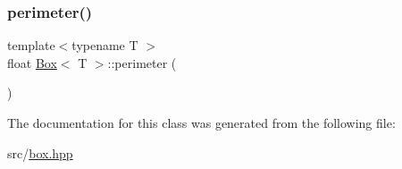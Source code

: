 \mbox{\label{classBox_ac64e9d619b0f3b991174a2ac49fef899}} 
\subsubsection{\texorpdfstring{perimeter()}{perimeter()}}
{\footnotesize\ttfamily template$<$typename T $>$ \\
float \mbox{\hyperlink{classBox}{Box}}$<$ T $>$\+::perimeter (\begin{DoxyParamCaption}{ }\end{DoxyParamCaption})}



The documentation for this class was generated from the following file\+:\begin{DoxyCompactItemize}
\item 
src/\mbox{\hyperlink{box_8hpp}{box.\+hpp}}\end{DoxyCompactItemize}

